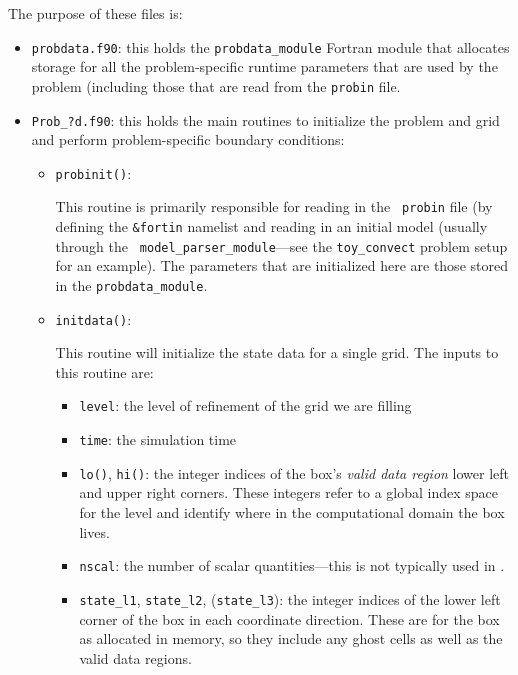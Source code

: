 The purpose of these files is:
\begin{itemize}
\item {\tt probdata.f90}: this holds the {\tt probdata\_module} Fortran module
  that allocates storage for all the problem-specific runtime parameters that
  are used by the problem (including those that are read from the {\tt probin}
  file.

\item {\tt Prob\_?d.f90}: this holds the main routines to
  initialize the problem and grid and perform problem-specific boundary
  conditions:

  \begin{itemize}
  \item {\tt probinit()}:

    This routine is primarily responsible for reading in the {\tt
      probin} file (by defining the {\tt \&fortin} namelist and
    reading in an initial model (usually through the {\tt
      model\_parser\_module}---see the {\tt toy\_convect} problem
    setup for an example).  The parameters that are initialized
    here are those stored in the {\tt probdata\_module}.

  \item {\tt initdata()}:

    This routine will initialize the state data for a single grid.
    The inputs to this routine are:
    \begin{itemize}
    \item {\tt level}: the level of refinement of the grid we are filling

    \item {\tt time}: the simulation time

    \item {\tt lo()}, {\tt hi()}: the integer indices of the box's {\em
      valid data region} lower left and upper right corners.  These
      integers refer to a global index space for the level and
      identify where in the computational domain the box lives.

    \item {\tt nscal}: the number of scalar quantities---this is not typically
      used in \pelelm.

    \item {\tt state\_l1}, {\tt state\_l2}, ({\tt state\_l3}): the
      integer indices of the lower left corner of the box in each
      coordinate direction.  These are for the box as allocated in memory,
      so they include any ghost cells as well as the valid data regions.


\end{itemize}
\end{itemize}
\end{itemize}
